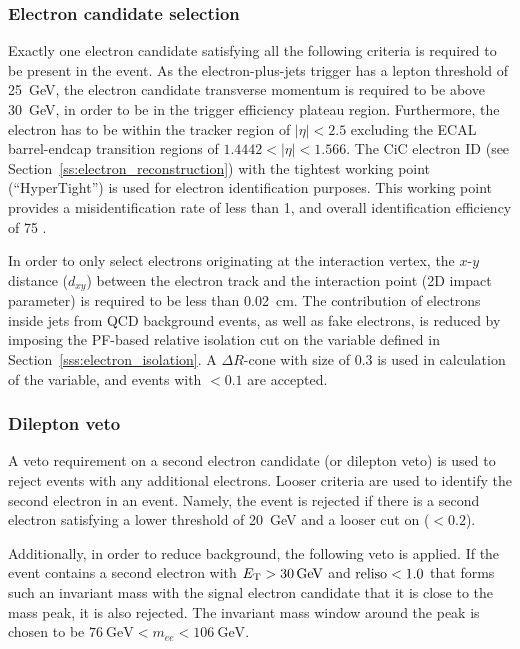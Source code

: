 \subsubsection*{Electron candidate selection}
Exactly one electron candidate satisfying all the following criteria is required to be present in the event. As the
electron-plus-jets trigger has a lepton \pt threshold of \SI{25}{\GeV}, the electron candidate transverse momentum is
required to be above \SI{30}{\GeV}, in order to be in the trigger efficiency plateau region. Furthermore, the electron
has to be within the tracker region of $|\eta| < 2.5$ excluding the ECAL barrel-endcap transition regions of $1.4442 <
|\eta| < 1.566$. The CiC electron ID (see Section~\ref{ss:electron_reconstruction}) with the tightest working point
(``HyperTight'') is used for electron identification purposes. This working point provides a misidentification rate of
less than \SI{1}{\pc}, and overall identification efficiency of \SI{75}{\pc} \autocite{CiC_ID}.

In order to only select electrons originating at the interaction vertex, the $x$-$y$ distance ($d_{xy}$) between the
electron track and the interaction point (2D impact parameter) is required to be less than \SI{0.02}{\cm}. The
contribution of electrons inside jets from QCD background events, as well as fake electrons, is reduced by imposing the
PF-based relative isolation cut on the variable \reliso defined in Section~\ref{sss:electron_isolation}. A $\Delta
R$-cone with size of \num{0.3} is used in calculation of the \reliso variable, and events with \reliso $< 0.1$ are
accepted.

\subsubsection*{Dilepton veto}
A veto requirement on a second electron candidate (or dilepton veto) is used to reject events with any additional
electrons. Looser criteria are used to identify the second electron in an event. Namely, the event is rejected if there
is a second electron satisfying a lower \ET threshold of \SI{20}{\GeV} and a looser cut on \reliso ($<0.2$).

Additionally, in order to reduce \ZpJets background, the following veto is applied. If the event contains a second
electron with $\ET > \SI{30}{\GeV}$ and $\textrm{reliso} < 1.0$ that forms such an invariant mass with the signal electron
candidate that it is close to the \Z mass peak, it is also rejected. The invariant mass window around the \Z peak is
chosen to be $\SI{76}{\GeV} < m_{ee} < \SI{106}{\GeV}$.

